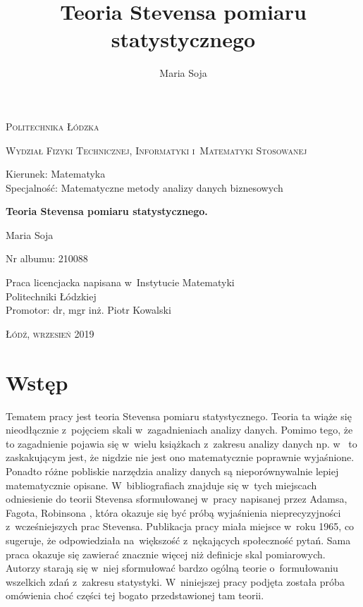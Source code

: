 \documentclass[12pt,a4paper]{report}
\author{Maria Soja}
\title{Teoria Stevensa pomiaru statystycznego}
\begin{document}
\begin{titlepage}
\begin{flushleft}
\end{flushleft}
\begin{center}
\textsc{{\huge Politechnika Łódzka}}
\end{center}
\bigskip
\bigskip
\begin{center}
\textsc{{\Large Wydział Fizyki Technicznej, Informatyki i~Matematyki Stosowanej}}
\end{center}
\bigskip
\bigskip
\begin{Large}
Kierunek: Matematyka 
\\Specjalność: Matematyczne metody analizy danych biznesowych

\end{Large}
\bigskip
\bigskip
\noindent\hrulefill
\begin{center}
{\textbf{{\Large Teoria Stevensa pomiaru statystycznego.}}}
\end{center}
\begin{flushright}
{\large 
Maria Soja

Nr albumu: 
210088
}
\end{flushright}
\noindent\hrulefill
\bigskip
\bigskip
\begin{center}
{\large Praca licencjacka
napisana w~Instytucie Matematyki 
\\Politechniki Łódzkiej 
\bigskip
\bigskip
\\Promotor: dr, mgr inż. Piotr Kowalski
 }
\end{center}
\bigskip
\bigskip
\bigskip
\bigskip
\begin{center}
{\textsc{\large Łódź, wrzesień 2019}}
\end{center}
\end{titlepage}


\tableofcontents

\chapter{Wstęp}

Tematem pracy jest teoria Stevensa pomiaru statystycznego. Teoria ta wiąże się nieodłącznie z~pojęciem skali w~zagadnieniach analizy danych. Pomimo tego, że to zagadnienie pojawia się w~wielu książkach z~zakresu analizy danych np. w~{\citep{walesiak2009statystyczna}} to zaskakującym jest, że nigdzie nie jest ono matematycznie poprawnie wyjaśnione. Ponadto różne pobliskie narzędzia analizy danych są nieporównywalnie lepiej matematycznie opisane. W~bibliografiach znajduje się w~tych miejscach odniesienie do teorii Stevensa sformułowanej w~pracy napisanej przez Adamsa, Fagota, Robinsona {\citep{adams1965theory}}, która okazuje się być próbą wyjaśnienia nieprecyzyjności z~wcześniejszych prac Stevensa. Publikacja pracy miała miejsce w~roku 1965, co sugeruje, że odpowiedziała na~większość z~nękających społeczność pytań. Sama praca okazuje się zawierać znacznie więcej niż definicje skal pomiarowych. Autorzy starają się w~niej sformułować bardzo ogólną teorie o~formułowaniu wszelkich zdań z~zakresu statystyki. W~niniejszej pracy podjęta została próba omówienia choć części tej bogato przedstawionej tam teorii. 
 
\end{document}
